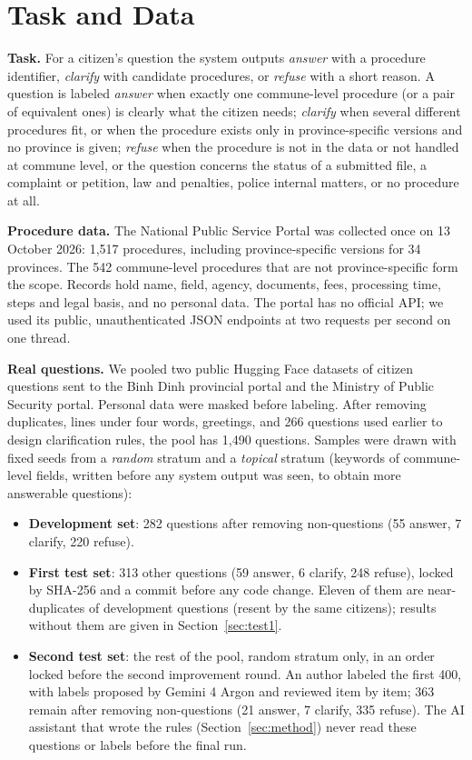 \section{Task and Data}

\textbf{Task.} For a citizen's question the system outputs \emph{answer} with a procedure identifier, \emph{clarify} with candidate
procedures, or \emph{refuse} with a short reason. A question is labeled \emph{answer} when exactly one commune-level procedure (or a pair of
equivalent ones) is clearly what the citizen needs; \emph{clarify} when several different procedures fit, or when the procedure exists
only in province-specific versions and no province is given; \emph{refuse} when the procedure is not in the data or not handled at commune
level, or the question concerns the status of a submitted file, a complaint or petition, law and penalties, police internal matters, or
no procedure at all.

\textbf{Procedure data.} The National Public Service Portal\cite{dvcportal} was collected once on 13 October 2026: 1,517 procedures,
including province-specific versions for 34 provinces. The 542 commune-level procedures that are not province-specific form the scope.
Records hold name, field, agency, documents, fees, processing time, steps and legal basis, and no personal data. The portal has no
official API; we used its public, unauthenticated JSON endpoints at two requests per second on one thread.

\textbf{Real questions.} We pooled two public Hugging Face datasets of citizen questions sent to the Binh Dinh provincial portal\cite{hfdvc}
and the Ministry of Public Security portal\cite{hfmps}. Personal data were masked before labeling. After removing duplicates, lines under
four words, greetings, and 266 questions used earlier to design clarification rules, the pool has 1,490 questions. Samples were drawn with
fixed seeds from a \emph{random} stratum and a \emph{topical} stratum (keywords of commune-level fields, written before any system output
was seen, to obtain more answerable questions):
\begin{itemize}
\item \textbf{Development set}: 282 questions after removing non-questions (55 answer, 7 clarify, 220 refuse).
\item \textbf{First test set}: 313 other questions (59 answer, 6 clarify, 248 refuse), locked by SHA-256 and a commit before any code
change. Eleven of them are near-duplicates of development questions (resent by the same citizens); results without them are given in
Section~\ref{sec:test1}.
\item \textbf{Second test set}: the rest of the pool, random stratum only, in an order locked before the second improvement round. An
author labeled the first 400, with labels proposed by Gemini 4 Argon and reviewed item by item; 363 remain after removing non-questions
(21 answer, 7 clarify, 335 refuse). The AI assistant that wrote the rules (Section~\ref{sec:method}) never read these questions or labels before the
final run.
\end{itemize}

